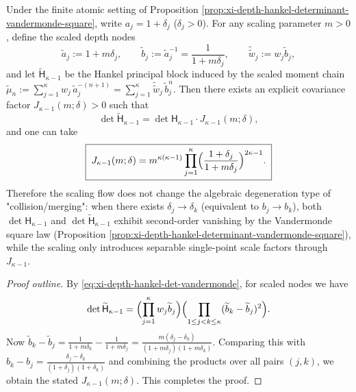\begin{proposition}\label{prop:xi-hankel-det-scaling-covariance}
Under the finite atomic setting of Proposition \ref{prop:xi-depth-hankel-determinant-vandermonde-square}, write \(a_j=1+\delta_j\) (\(\delta_j>0\)).
For any scaling parameter \(m>0\), define the scaled depth nodes
\[
\widetilde a_j:=1+m\delta_j,
\qquad
\widetilde b_j:=\widetilde a_j^{-1}=\frac{1}{1+m\delta_j},
\qquad
\widetilde{\widetilde w}_j:=w_j\widetilde b_j,
\]
and let \(\widetilde{\mathsf H}_{\kappa-1}\) be the Hankel principal block induced by the scaled moment chain
\(
\widetilde\mu_n:=\sum_{j=1}^{\kappa}w_j\,\widetilde a_j^{-(n+1)}
=\sum_{j=1}^{\kappa}\widetilde{\widetilde w}_j\,\widetilde b_j^{n}
\).
Then there exists an explicit covariance factor \(J_{\kappa-1}(m;\delta)>0\) such that
\[
\boxed{\;
\det \widetilde{\mathsf H}_{\kappa-1}
=\det \mathsf H_{\kappa-1}\cdot J_{\kappa-1}(m;\delta),\;}
\]
and one can take
\[
\boxed{\;
J_{\kappa-1}(m;\delta)
=m^{\kappa(\kappa-1)}
\prod_{j=1}^{\kappa}\Bigl(\frac{1+\delta_j}{1+m\delta_j}\Bigr)^{2\kappa-1}.\;}
\]
Therefore the scaling flow does not change the algebraic degeneration type of "collision/merging": when there exists \(\delta_j\to\delta_k\) (equivalent to \(b_j\to b_k\)), both \(\det \mathsf H_{\kappa-1}\) and \(\det\widetilde{\mathsf H}_{\kappa-1}\) exhibit second-order vanishing by the Vandermonde square law (Proposition \ref{prop:xi-depth-hankel-determinant-vandermonde-square}), while the scaling only introduces separable single-point scale factors through \(J_{\kappa-1}\).
\end{proposition}
\begin{proof}[Proof outline]
By \eqref{eq:xi-depth-hankel-det-vandermonde}, for scaled nodes we have
\[
\det \widetilde{\mathsf H}_{\kappa-1}
=\Bigl(\prod_{j=1}^{\kappa}w_j\widetilde b_j\Bigr)\Bigl(\prod_{1\le j<k\le\kappa}(\widetilde b_k-\widetilde b_j)^2\Bigr).
\]
Now
\(
\widetilde b_k-\widetilde b_j=\frac{1}{1+m\delta_k}-\frac{1}{1+m\delta_j}
=\frac{m(\delta_j-\delta_k)}{(1+m\delta_j)(1+m\delta_k)}
\).
Comparing this with \(b_k-b_j=\frac{\delta_j-\delta_k}{(1+\delta_j)(1+\delta_k)}\) and combining the products over all pairs \((j,k)\), we obtain the stated \(J_{\kappa-1}(m;\delta)\). This completes the proof.
\end{proof}

